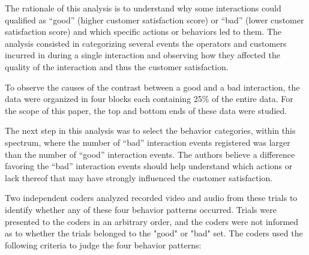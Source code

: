 \documentclass[journal]{IEEEtran}
\begin{document}
The rationale of this analysis is to understand why some interactions could qualified as ``good'' (higher customer satisfaction score) or ``bad'' (lower customer satisfaction score) and which specific actions or behaviors led to them.
The analysis consisted in categorizing several events the operators and customers incurred in during a single interaction and observing how they affected the quality of the interaction and thus the customer satisfaction.

To observe the causes of the contrast between a good and a bad interaction, the data were organized in four blocks each containing 25\% of the entire data.
For the scope of this paper, the top and bottom ends of these data were studied.

The next step in this analysis was to select the behavior categories, within this spectrum, where the number of ``bad'' interaction events registered was larger than the number of ``good'' interaction events. 
The authors believe a difference favoring the ``bad'' interaction events should help understand which actions or lack thereof that may have strongly influenced the customer satisfaction. 

Two independent coders analyzed recorded video and audio from these trials to identify whether any of these four behavior patterns occurred. 
Trials were presented to the coders in an arbitrary order, and the coders were not informed as to whether the trials belonged to the "good" or "bad" set. 
The coders used the following criteria to judge the four behavior patterns:
\end{document}
